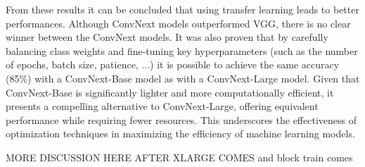 \documentclass[11pt]{article}
\begin{document}
\begin{multicols}{2}
        From these results it can be concluded that using transfer learning leads to better performances. Although ConvNext models outperformed VGG, there is no clear winner between the ConvNext models.
        It was also proven that by carefully balancing class weights and fine-tuning key hyperparameters (such as the number of epochs, batch size, patience, ...) it is possible to achieve the same accuracy (85\%) with a ConvNext-Base model as with a ConvNext-Large model. Given that ConvNext-Base is significantly lighter and more computationally efficient, it presents a compelling alternative to ConvNext-Large, offering equivalent performance while requiring fewer resources. This underscores the effectiveness of optimization techniques in maximizing the efficiency of machine learning models.
        
        \color{red} MORE DISCUSSION HERE AFTER XLARGE COMES and block train comes \color{black} 
        

\end{multicols}
\end{document}
